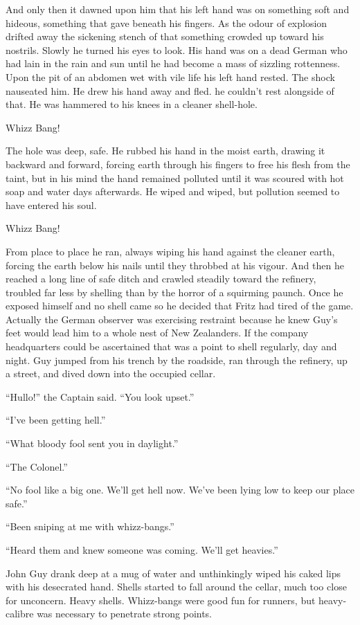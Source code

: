 And only then it dawned upon him that his left hand was on something soft and hideous, something that gave beneath his fingers. As the odour of explosion drifted away the sickening stench of that something crowded up toward his nostrils. Slowly he turned his eyes to look. His hand was on a dead German who had lain in the rain and sun until he had become a mass of sizzling rottenness. Upon the pit of an abdomen wet with vile life his left hand rested. The shock nauseated him. He drew his hand away and fled. he couldn't rest alongside of that. He was hammered to his knees in a cleaner shell-hole.

Whizz Bang!

The hole was deep, safe. He rubbed his hand in the moist earth, drawing it backward and forward, forcing earth through his fingers to free his flesh from the taint, but in his mind the hand remained polluted until it was scoured with hot soap and water days afterwards. He wiped and wiped, but pollution seemed to have entered his soul.

Whizz Bang!

From place to place he ran, always wiping his hand against the cleaner earth, forcing the earth below his nails until they throbbed at his vigour. And then he reached a long line of safe ditch and crawled steadily toward the refinery, troubled far less by shelling than by the horror of a squirming paunch. Once he exposed himself and no shell came so he decided that Fritz had tired of the game. Actually the German observer was exercising restraint because he knew Guy's feet would lead him to a whole nest of New Zealanders. If the company headquarters could be ascertained that was a point to shell regularly, day and night. Guy jumped from his trench by the roadside, ran through the refinery, up a street, and dived down into the occupied cellar.

``Hullo!'' the Captain said. ``You look upset.''

``I've been getting hell.''

``What bloody fool sent you in daylight.''

``The Colonel.''

``No fool like a big one. We'll get hell now. We've been lying low to keep our place safe.''

``Been sniping at me with whizz-bangs.''

``Heard them and knew someone was coming. We'll get heavies.''

John Guy drank deep at a mug of water and unthinkingly wiped his caked lips with his desecrated hand. Shells started to fall around the cellar, much too close for unconcern. Heavy shells. Whizz-bangs were good fun for runners, but heavy-calibre was necessary to penetrate strong points.

